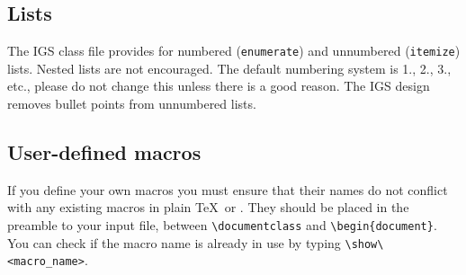 \documentclass[twocolumn]{igs}
\begin{document}
\subsection{Lists}
The IGS class file provides for numbered (\verb"enumerate") and unnumbered (\verb"itemize") lists. Nested lists are not encouraged. The default numbering system is 1., 2., 3., etc., please do not change this unless there is a good reason. The IGS design removes bullet points from unnumbered lists.

\subsection{User-defined macros}
If you define your own macros you must ensure that their names do not conflict with any existing macros in plain \TeX\ or \LaTeXe. They should be placed in the preamble to your input file, between \verb"\documentclass" and \verb"\begin{document}". You can check if the macro name is already in use by typing \verb"\show\<macro_name>".
\end{document}
